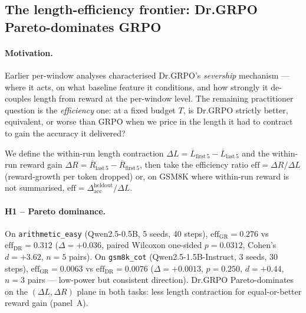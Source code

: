 %

\subsection{The length-efficiency frontier: Dr.GRPO Pareto-dominates GRPO}
\label{sec:length-bias-iter128}

\paragraph{Motivation.}
Earlier per-window analyses characterised Dr.GRPO's \emph{severship}
mechanism --- where it acts, on what baseline feature it conditions, and how
strongly it de-couples length from reward at the per-window level.  The remaining
practitioner question is the \emph{efficiency} one: at a fixed
budget $T$, is Dr.GRPO strictly better, equivalent, or worse than
GRPO when we price in the length it had to contract to gain the
accuracy it delivered?

We define the within-run length contraction
$\Delta L = \overline{L}_{\mathrm{first}\,5} - \overline{L}_{\mathrm{last}\,5}$
and the within-run reward gain
$\Delta R = \overline{R}_{\mathrm{last}\,5} - \overline{R}_{\mathrm{first}\,5}$,
then take the efficiency ratio
$\mathrm{eff} = \Delta R / \Delta L$ (reward-growth per token dropped)
or, on GSM8K where within-run reward is not summarised,
$\mathrm{eff} = \Delta_{\mathrm{acc}}^{\mathrm{heldout}} / \Delta L$.

\paragraph{H1 -- Pareto dominance.}
On \texttt{arithmetic\_easy} (Qwen2.5-0.5B, 5 seeds, 40 steps),
$\mathrm{eff}_{\mathrm{GR}} = 0.276$ vs $\mathrm{eff}_{\mathrm{DR}} = 0.312$
($\Delta = +0.036$, paired Wilcoxon one-sided $p = 0.0312$,
Cohen's $d = +3.62$, $n{=}5$ pairs).
On \texttt{gsm8k\_cot} (Qwen2.5-1.5B-Instruct, 3 seeds, 30 steps),
$\mathrm{eff}_{\mathrm{GR}} = 0.0063$ vs $\mathrm{eff}_{\mathrm{DR}} = 0.0076$
($\Delta = +0.0013$, $p = 0.250$, $d = +0.44$, $n{=}3$ pairs ---
low-power but consistent direction).
Dr.GRPO Pareto-dominates on the $(\Delta L, \Delta R)$ plane in both
tasks: less length contraction for equal-or-better reward gain (panel~A).

